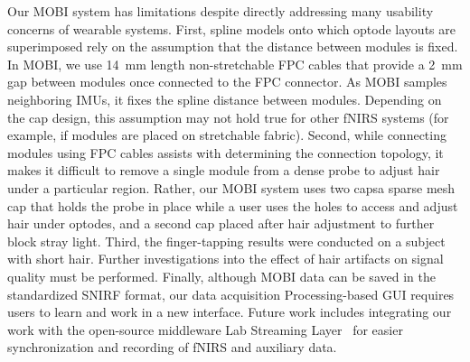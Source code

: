 Our MOBI system has limitations despite directly addressing many usability concerns of wearable systems. First, spline models onto which optode layouts are superimposed rely on the assumption that the distance between modules is fixed. In MOBI, we use 14~mm length non-stretchable FPC cables that provide a 2~mm gap between modules once connected to the FPC connector. As MOBI samples neighboring IMUs, it fixes the spline distance between modules. Depending on the cap design, this assumption may not hold true for other fNIRS systems (for example, if modules are placed on stretchable fabric). Second, while connecting modules using FPC cables assists with determining the connection topology, it makes it difficult to remove a single module from a dense probe to adjust hair under a particular region. Rather, our MOBI system uses two caps\textemdash a sparse mesh cap that holds the probe in place while a user uses the holes to access and adjust hair under optodes, and a second cap placed after hair adjustment to further block stray light. Third, the finger-tapping results were conducted on a subject with short hair. Further investigations into the effect of hair artifacts on signal quality must be performed. Finally, although MOBI data can be saved in the standardized SNIRF format, our data acquisition Processing-based GUI requires users to learn and work in a new interface. Future work includes integrating our work with the open-source middleware Lab Streaming Layer~\cite{LSL2014} for easier synchronization and recording of fNIRS and auxiliary data. 


